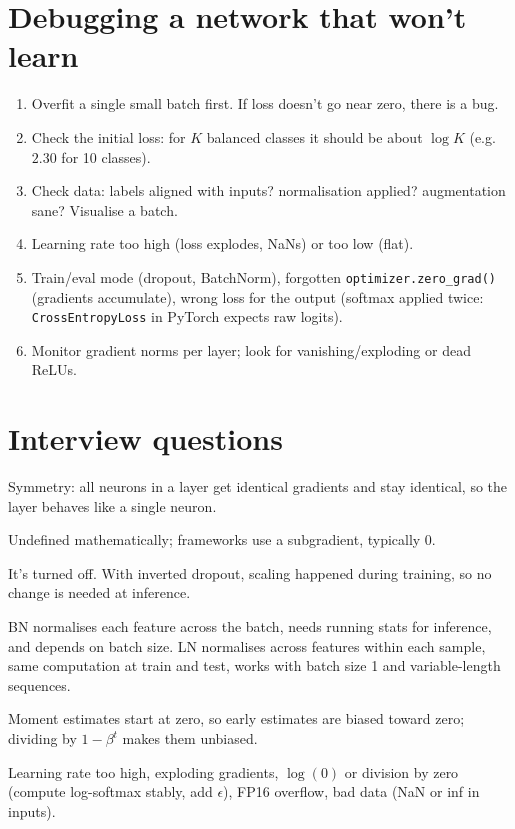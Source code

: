 \section{Debugging a network that won't learn}
\begin{enumerate}
  \item Overfit a single small batch first. If loss doesn't go near zero, there is a bug.
  \item Check the initial loss: for $K$ balanced classes it should be about $\log K$ (e.g.\ $2.30$ for 10 classes).
  \item Check data: labels aligned with inputs? normalisation applied? augmentation sane? Visualise a batch.
  \item Learning rate too high (loss explodes, NaNs) or too low (flat).
  \item Train/eval mode (dropout, BatchNorm), forgotten \texttt{optimizer.zero\_grad()} (gradients accumulate), wrong loss for the output (softmax applied twice: \texttt{CrossEntropyLoss} in PyTorch expects raw logits).
  \item Monitor gradient norms per layer; look for vanishing/exploding or dead ReLUs.
\end{enumerate}

\section{Interview questions}
\A Symmetry: all neurons in a layer get identical gradients and stay identical, so the layer behaves like a single neuron.

\A Undefined mathematically; frameworks use a subgradient, typically 0.

\A It's turned off. With inverted dropout, scaling happened during training, so no change is needed at inference.

\A BN normalises each feature across the batch, needs running stats for inference, and depends on batch size. LN normalises across features within each sample, same computation at train and test, works with batch size 1 and variable-length sequences.

\A Moment estimates start at zero, so early estimates are biased toward zero; dividing by $1-\beta^t$ makes them unbiased.

\A Learning rate too high, exploding gradients, $\log(0)$ or division by zero (compute log-softmax stably, add $\epsilon$), FP16 overflow, bad data (NaN or inf in inputs).

